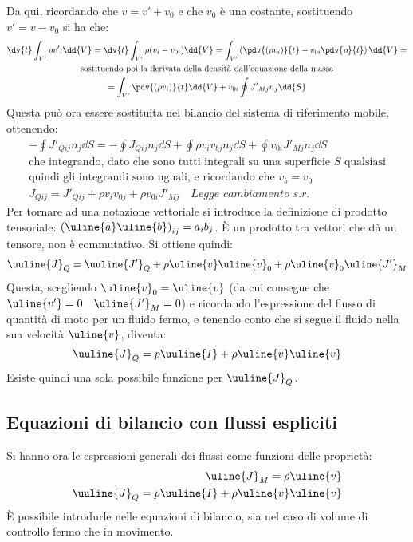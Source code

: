 %
Da qui, ricordando che $v = v' + v_0$ e che $v_0$ è una costante, sostituendo $v' = v - v_0$ si ha che:
	\begin{equation*}
		\begin{gathered}
			\dv{t} \int_{V'} \rho {v'}_i \dd{V} = \dv{t} \int_{V'} \rho (v_i - v_{0i}) \dd{V} = \int_{V'} \left( \pdv{(\rho v_i)}{t} - v_{0i} \pdv{\rho}{t} \right) \dd{V} = \\
			\text{sostituendo poi la derivata della densità dall'equazione della massa}\\
			= \int_{V'} \pdv{(\rho v_i)}{t} \dd{V} + v_{0i} \oint {J'}_{Mj} n_j \dd{S}
		\end{gathered}
	\end{equation*}
%
Questa può ora essere sostituita nel bilancio del sistema di riferimento mobile, ottenendo:
%
	\begin{equation*}
		\begin{gathered}
			- \oint J'_{Qij} n_j \dd{S} = - \oint J_{Qij} n_j \dd{S} + \oint \rho v_i v_{bj} n_j \dd{S} + \oint v_{0i} J'_{Mj} n_j \dd{S} \\
			\text{che integrando, dato che sono tutti integrali su una superficie $S$ qualsiasi}\\
			\text{quindi gli integrandi sono uguali, e ricordando che $v_b = v_0$} \\
			J_{Qij} = J'_{Qij} + \rho v_i v_{0j} + \rho v_{0i} J'_{Mj} \quad \textit{Legge cambiamento s.r.}
		\end{gathered}
	\end{equation*}
%
Per tornare ad una notazione vettoriale si introduce la definizione di prodotto tensoriale: ${(\uline{a} \uline{b})}_{ij} = a_i b_j$. 
È un prodotto tra vettori che dà un tensore, non è commutativo.
Si ottiene quindi:
%
	\begin{equation*}
		\uuline{J}_Q = \uuline{J'}_Q + \rho \uline{v} \uline{v}_0 + \rho \uline{v}_0 \uline{J'}_M
	\end{equation*}
%
Questa, scegliendo $\uline{v}_0 = \uline{v}$ (da cui consegue che $\uline{v'} = 0 \quad \uline{J'}_M = 0$) e ricordando l'espressione del flusso di quantità di moto per un fluido fermo, e tenendo conto che si segue il fluido nella sua velocità $\uline{v}$, diventa:
%
	\begin{equation*}
		\uuline{J}_Q = p \uuline{I} + \rho \uline{v} \uline{v}
	\end{equation*}
%
Esiste quindi una sola possibile funzione per $\uuline{J}_Q$.

\subsection{Equazioni di bilancio con flussi espliciti}
Si hanno ora le espressioni generali dei flussi come funzioni delle proprietà: 
%
	\begin{equation*}
		\begin{aligned}
			\uline{J}_M = \rho \uline{v} \\
			\uuline{J}_Q = p \uuline{I} + \rho \uline{v} \uline{v}
		\end{aligned}
	\end{equation*}
%
È possibile introdurle nelle equazioni di bilancio, sia nel caso di volume di controllo fermo che in movimento.
%
